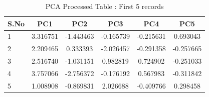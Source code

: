 \begin{table}[h]
	\centering
	\caption{PCA Processed Table : First 5 records}
	\begin{tabular}{|p{3cm}|c|c|c|c|c|}
		\hline
		\fontsize{10}{12}\selectfont
		\textbf{S.No} & \textbf{PC1} & \textbf{PC2} & \textbf{PC3} & \textbf{PC4} & \textbf{PC5}\\
		\hline
		1 & 3.316751 & -1.443463 & -0.165739 & -0.215631 & 0.693043\\
		\hline
		2 & 2.209465 & 0.333393 & -2.026457 & -0.291358 & -0.257665\\
		\hline
		3 & 2.516740 & -1.031151 & 0.982819 & 0.724902 & -0.251033\\
		\hline
		4 & 3.757066 & -2.756372 & -0.176192 & 0.567983 & -0.311842\\
		\hline
		5 & 1.008908 & -0.869831 & 2.026688 & -0.409766 & 0.298458\\
		\hline
	\end{tabular}
	
	\label{table:5}
\end{table}

